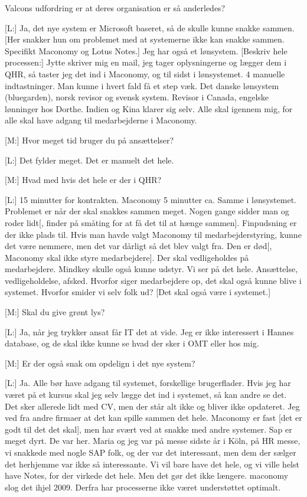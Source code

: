 \begin{linenumbers*}
[M:] Valcons udfordring er at deres organisation er så anderledes?

[L:]  Ja, det nye system er Microsoft baseret, så de skulle kunne snakke sammen. [Her snakker hun om problemet med at systemerne ikke kan snakke sammen. Specifikt Maconomy og Lotus Notes.]
Jeg har også et lønsystem.
[Beskriv hele processen:] Jytte skriver mig en mail, jeg tager oplysningerne og lægger dem i QHR, så taster jeg det ind i Maconomy, og til sidst i lønsystemet. 4 manuelle indtastninger. Man kunne i hvert fald få et step væk. Det danske lønsystem (bluegarden), norsk revisor og svensk system. Revisor i Canada, engelske lønninger hos Dorthe. Indien og Kina klarer sig selv. Alle skal igennem mig, for alle skal have adgang til medarbejderne i Maconomy.

[M:] Hvor meget tid bruger du på ansættelser?

[L:] Det fylder meget. Det er manuelt det hele.

[M:] Hvad med hvis det hele er der i QHR? 

[L:] 15 minutter for kontrakten. Maconomy 5 minutter ca. Samme i lønsystemet. Problemet er når der skal snakkes sammen meget. Nogen gange sidder man og roder lidt[, finder på småting for at få det til at hænge sammen]. Finpudsning er der ikke plads til. Hvis man havde valgt Maconomy til medarbejderstyring, kunne det være nemmere, men det var dårligt så det blev valgt fra. Den er død[, Maconomy skal ikke styre medarbejdere]. Der skal vedligeholdes på medarbejdere. Mindkey skulle også kunne udstyr. Vi ser på det hele. Ansættelse, vedligeholdelse, afsked. Hvorfor siger medarbejdere op, det skal også kunne blive i systemet. Hvorfor smider vi selv folk ud? [Det skal også være i systemet.]

[M:] Skal du give grønt lys?

[L:] Ja, når jeg trykker ansat får IT det at vide. Jeg er ikke interessert i Hannes database, og de skal ikke kunne se hvad der sker i OMT eller hos mig.

[M:] Er der også snak om opdelign i det nye system?

[L:] Ja.
Alle bør have adgang til systemet, forskellige brugerflader. Hvis jeg har været på et kursus skal jeg selv lægge det ind i systemet, så kan andre se det. Det sker allerede lidt med CV, men der står alt ikke og bliver ikke opdateret.
Jeg ved fra andre firmaer at det kan spille sammen det hele.
Maconomy er fast [det er godt til det det skal], men har svært ved at snakke med andre systemer. Sap er meget dyrt. De var her.
Maria og jeg var på messe sidste år i Köln, på HR messe, vi snakkede med nogle SAP folk, og der var det interessant, men dem der sælger det herhjemme var ikke så interessante. Vi vil bare have det hele, og vi ville helst have Notes, for der virkede det hele. Men det gør det ikke længere. maconomy slog det ihjel 2009. Derfra har processerne ikke været understøttet optimalt. 


\end{linenumbers*}
